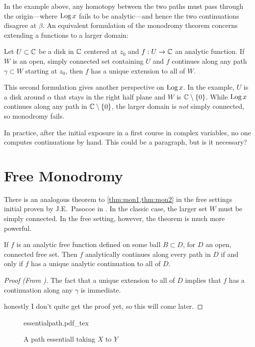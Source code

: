 In the example above, any homotopy between the two paths must pass through the
origin---where \(\operatorname{Log} x\) fails to be analytic---and hence the two continuations
disagree at \(\beta\).
An equivalent formulation of the monodromy theorem concerns extending a
functions to a larger domain:

\begin{theorem}[Monodromy II]%
\label{thm:mon2}
  Let \(U \subset \mathbb{C} \) be a disk in \(\mathbb{C} \) centered at \(z_0\) and
  \(f: U \to \mathbb{C} \) an analytic function. If \(W\) is
  an open, simply connected set containing \(U\) and \(f\) continues along any
  path \(\gamma \subset W\) starting at \(z_0\), then \(f\) has a unique
  extension to all of \(W\).
\end{theorem}

This second formulation gives another perspective on \(\operatorname{Log} x\). In the example,
\(U\) is a disk around \(\alpha\) that stays in the right half plane and \(W\)
is \(\mathbb{C} \setminus \{0\} \). While \(\operatorname{Log} x\) continues along any path in
\(\mathbb{C}  \setminus \{0\} \), the larger domain is \emph{not} simply connected, so
monodromy fails.

In practice, after the initial exposure in a first course in complex variables,
no one computes continuations by hand. {\color{red} This could be a paragraph,
  but is it necessary?}

\section{Free Monodromy}%
\label{sec:freemono}

There is an analogous theorem to \cref{thm:mon1,thm:mon2} in the free settings
initial proven by J.E.\ Pasocoe in \cite{pascoeNoncommutative2020}.
In the classic case, the larger set \(W\) must be simply connected. In the free
setting, however, the theorem is much more powerful.

\begin{theorem}%
  \label{thm:freemono}
  If \(f\) is an analytic free function defined on some ball \(B \subset D\),
  for \(D\) an open, connected free set.
  Then \(f\) analytically continues along every path in \(D\) if and only if
  \(f\) has a unique analytic continuation to all of \(D\).
\end{theorem}

\begin{proof}
  [Proof (From \cite{pascoeNoncommutative2020})]
  The fact that a unique extension to all of \(D\) implies that \(f\) has a
  continuation along any \(\gamma\) is immediate.

  {\color{red} honestly I don't quite get the proof yet, so this will come later.}
\end{proof}




\begin{figure}[h!]
\centering
  \def\svgwidth{0.9\columnwidth}
  {essentialpath.pdf_tex}
\caption{A path essentiall taking \(X\) to \(Y\)}
\label{fig:esspath}
\end{figure}
